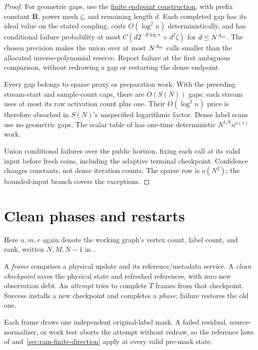 \documentclass[11pt]{article}
\theoremstyle{remark}
\newcommand{\BB}{\mathbf B}
\begin{document}
\begin{proof}
For geometric gaps, use the \hyperref[par:ram-stream-endpoint]{finite endpoint
construction}, with prefix constant $\BB$, power mesh $\zeta$, and remaining
length $d$.
Each completed gap has its ideal value on the stated coupling, costs $O(\log^2 n)$
deterministically, and has conditional failure probability at most
$C(d2^{-B\log n}+d^2\zeta)$ for $d\le N^{A_{\rm st}}$.
The chosen precision makes the union over at most $N^{A_{\rm st}}$ calls smaller than the
allocated inverse-polynomial reserve.
Report failure at the first ambiguous comparison, without redrawing a gap or
restarting the dense endpoint.

Every gap belongs to sparse proxy or preparation work.
With the preceding stream-start and sample-count caps, there are $O(S(N))$ gaps:
each stream uses at most its raw activation count plus one.
Their $O(\log^2 n)$ price is therefore absorbed in $S(N)$'s unspecified logarithmic
factor.
Dense label scans use no geometric gaps.
The scalar table of  has one-time deterministic
$N^{1/8}n^{o(1)}$ work.

Union conditional failures over the public horizon, fixing each call at its
valid input before fresh coins, including the adaptive terminal checkpoint.
Confidence changes constants, not dense iteration counts.
The sparse row is $o(N^2)$; the bounded-input branch covers the exceptions.
\end{proof}

\section{Clean phases and restarts}
\label{sec:ram-phases}

Here $n,m,r$ again denote the working graph's vertex count, label count, and
rank, written $N,M,N-1$ in .

A \emph{frame} comprises a physical update and its reference/metadata service.
A \emph{clean checkpoint} saves the physical state and refreshed references,
with zero new observation debt.
An \emph{attempt} tries to complete $T$ frames from that checkpoint.
Success installs a new checkpoint and completes a \emph{phase}; failure restores
the old one.

Each frame draws one independent original-label mask.
A failed residual, source-normalizer, or work test aborts the attempt without
redraw, so the reference laws of 
and~\ref{sec:ram-finite-direction} apply at every valid pre-mask state.
\end{document}
